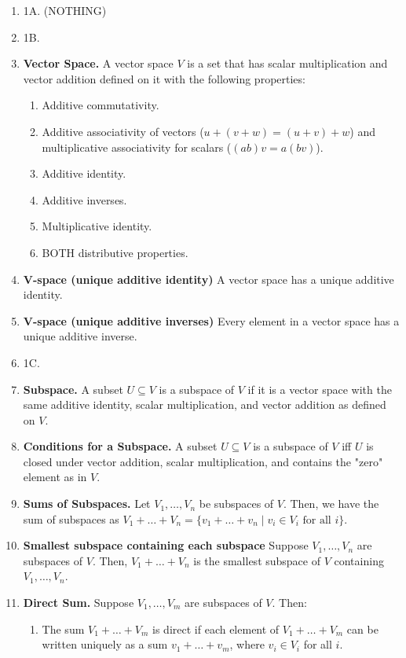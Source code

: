

\begin{enumerate}
	\item 1A. (NOTHING)
	\item 1B. 
	\item \textbf{Vector Space. } A vector space $V$ is a set that has scalar multiplication and vector addition defined on it with the following properties: 
	\begin{enumerate}
		\item Additive commutativity. 
		\item Additive associativity of vectors ($u+(v+w)=(u+v)+w$) and multiplicative associativity for scalars ($(ab)v = a(bv)$). 
		\item Additive identity. 
		\item Additive inverses. 
		\item Multiplicative identity. 
		\item BOTH distributive properties. 
	\end{enumerate}
	\item \textbf{V-space (unique additive identity) } A vector space has a unique additive identity. 
	\item \textbf{V-space (unique additive inverses) } Every element in a vector space has a unique additive inverse. 
	\item 1C. 
	\item \textbf{Subspace. } A subset $U \subseteq V$ is a subspace of $V$ if it is a vector space with the same additive identity, scalar multiplication, and vector addition as defined on $V$. 
	\item \textbf{Conditions for a Subspace. } A subset $U \subseteq V$ is a subspace of $V$ iff $U$ is closed under vector addition, scalar multiplication, and contains the "zero" element as in $V$. 
	\item \textbf{Sums of Subspaces. } Let $V_1,\dots,V_n$ be subspaces of $V$. Then, we have the sum of subspaces as $V_1 + \dots + V_n = \{v_1 + \dots + v_n \mid v_i \in V_i \textrm{ for all } i\}$. 
	\item \textbf{Smallest subspace containing each subspace} Suppose $V_1,\dots,V_n$ are subspaces of $V$. Then, $V_1 + \dots + V_n$ is the smallest subspace of $V$ containing $V_1,\dots,V_n$. 
	\item \textbf{Direct Sum. } Suppose $V_1,\dots,V_m$ are subspaces of $V$. Then: 
	\begin{enumerate}
		\item The sum $V_1 + \dots + V_m$ is direct if each element of $V_1 + \dots + V_m$ can be written uniquely as a sum $v_1 + \dots + v_m$, where $v_i \in V_i$ for all $i$. 

\end{enumerate}
\end{enumerate}
